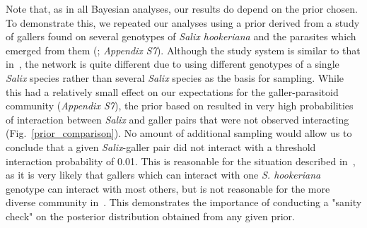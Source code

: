 \documentclass[12pt]{article}
\begin{document}
\begin{spacing}{2.0}
  Note that, as in all Bayesian analyses, our results do depend on the prior chosen. To demonstrate this, we repeated our analyses using a prior derived from a study of gallers found on several genotypes of \emph{Salix hookeriana} and the parasites which emerged from them (\citealp{Barbour2016,Barbour2016Dryad}; \emph{Appendix S7}). Although the study system is similar to that in~\citet{Kopelke2017}, the network is quite different due to using different genotypes of a single \emph{Salix} species rather than several \emph{Salix} species as the basis for sampling. While this had a relatively small effect on our expectations for the galler-parasitoid community (\emph{Appendix S7}), the prior based on \citep{Barbour2016} resulted in very high probabilities of interaction between \emph{Salix} and galler pairs that were not observed interacting (Fig.~\ref{prior_comparison}). No amount of additional sampling would allow us to conclude that a given \emph{Salix}-galler pair did not interact with a threshold interaction probability of 0.01. This is reasonable for the situation described in~\citet{Barbour2016}, as it is very likely that gallers which can interact with one \emph{S. hookeriana} genotype can interact with most others, but is not reasonable for the more diverse community in~\citet{Kopelke2017}. This demonstrates the importance of conducting a "sanity check" on the posterior distribution obtained from any given prior.





\end{spacing}
\end{document}
